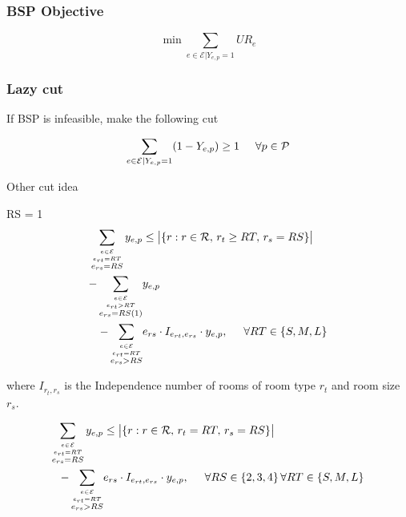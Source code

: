 \documentclass{article}
\newcommand{\scriptP}{\mathcal{P}}
\newcommand{\scriptR}{\mathcal{R}}
\newcommand{\scriptE}{\mathcal{E}}
\begin{document}
\subsubsection{BSP Objective}
$$\min \sum_{e\in \scriptE | Y_{e,p} = 1} UR_{e}$$

\subsubsection{Lazy cut}

If BSP is infeasible, make the following cut

$$\sum_{e\in\scriptE | Y_{e,p} = 1}(1-Y_{e,p}) \ge 1 \hspace{0.5cm} \forall p \in \scriptP$$



Other cut idea

RS = 1
\begin{align}
    \sum_{\stackrel{e\in\scriptE}{\stackrel{e_{rt}=RT}{e_{rs} = RS}}} y_{e,p} &\le \big|\{r : r\in\scriptR,\, r_{t}\ge RT,\, r_{s}=RS\}\big| \nonumber
    \\ - \sum_{\stackrel{e\in \scriptE}{\stackrel{e_{rt} > RT}{e_{rs} = RS (1)}}} &  y_{e,p} \nonumber
    \\ - \sum_{\stackrel{e\in \scriptE}{\stackrel{e_{rt} = RT}{e_{rs} > RS}}} & e_{rs} \cdot I_{e_{rt}, e_{rs}} \cdot y_{e,p}, \hspace{0.5cm} \forall RT \in \left\{S, M, L\right\}    
\end{align}

where $I_{r_t, r_s}$ is the Independence number of rooms of room type $r_t$ and room size $r_s$.

\begin{align}
    \sum_{\stackrel{e\in\scriptE}{\stackrel{e_{rt}=RT}{e_{rs} = RS}}} y_{e,p} &\le \big|\{r : r\in\scriptR,\, r_{t}=RT,\, r_{s}=RS\}\big| \nonumber
    \\ - \sum_{\stackrel{e\in \scriptE}{\stackrel{e_{rt} = RT}{e_{rs} > RS}}} & e_{rs} \cdot I_{e_{rt}, e_{rs}} \cdot y_{e,p}, \hspace{0.5cm} \forall RS \in \left\{2,3,4\right\} \forall RT \in \left\{S, M, L\right\}    
\end{align}
\end{document}
